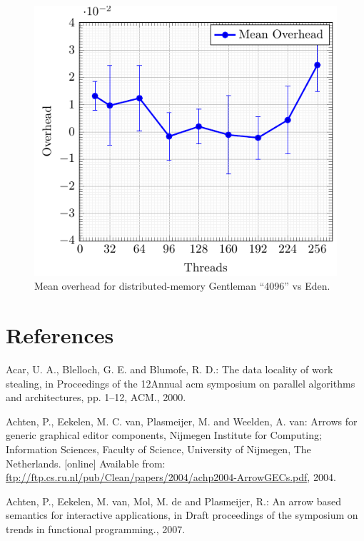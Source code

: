 \documentclass[paper=A4,twoside=true,openright,parskip=full,chapterprefix=true,headings=normal,bibliography=totoc,listof=totoc,titlepage=on,captions=tableabove,draft=false,british]{scrreprt}%
\renewcommand{\enquote}[1]{{``}#1{''}}
\begin{document}
\begin{figure}[h]
\centering
\includegraphics{src/img/overDistTorusEden.pdf}
\caption{Mean overhead for distributed-memory Gentleman \enquote{4096}
vs Eden.\label{fig:overDistTorusEden}}
\end{figure}

\hypertarget{references}{%
\chapter*{References}\label{references}}

\hypertarget{refs}{}
\leavevmode\hypertarget{ref-Acar:2000:DLW:341800.341801}{}%
Acar, U. A., Blelloch, G. E. and Blumofe, R. D.: The data locality of
work stealing, in Proceedings of the 12Annual acm symposium on parallel
algorithms and architectures, pp. 1--12, ACM., 2000.

\leavevmode\hypertarget{ref-achten2004arrows}{}%
Achten, P., Eekelen, M. C. van, Plasmeijer, M. and Weelden, A. van:
Arrows for generic graphical editor components, Nijmegen Institute for
Computing; Information Sciences, Faculty of Science, University of
Nijmegen, The Netherlands. {[}online{]} Available from:
\url{ftp://ftp.cs.ru.nl/pub/Clean/papers/2004/achp2004-ArrowGECs.pdf},
2004.

\leavevmode\hypertarget{ref-achten2007arrow}{}%
Achten, P., Eekelen, M. van, Mol, M. de and Plasmeijer, R.: An arrow
based semantics for interactive applications, in Draft proceedings of
the symposium on trends in functional programming., 2007.
\end{document}
